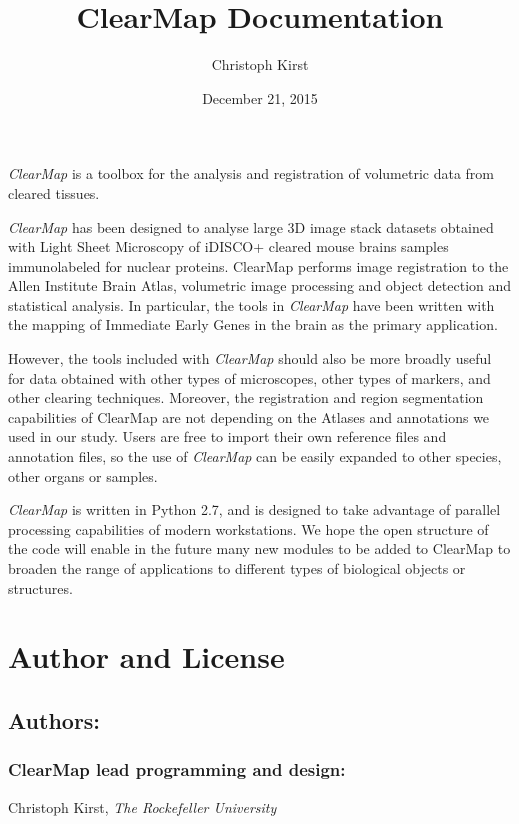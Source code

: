 \documentclass[letterpaper,10pt,english]{sphinxmanual}
\title{ClearMap Documentation}
\date{December 21, 2015}
\author{Christoph Kirst}
\begin{document}
\maketitle
\tableofcontents
{}\label{index::doc}


\emph{ClearMap} is a toolbox for the analysis and registration of volumetric data
from cleared tissues.

\emph{ClearMap} has been designed to analyse large 3D image stack datasets obtained with Light Sheet Microscopy
of iDISCO+ cleared mouse brains samples immunolabeled for nuclear proteins. ClearMap performs image registration to the Allen Institute Brain Atlas, volumetric image processing and object detection and statistical analysis. In particular, the tools in \emph{ClearMap} have been written with the mapping of Immediate Early Genes in the brain as the primary application.

However, the tools included with \emph{ClearMap} should also be more broadly useful for data obtained with other types of microscopes, other types of markers, and other clearing techniques. Moreover, the registration and region segmentation capabilities of ClearMap are not depending on the Atlases and annotations we used in our study. Users are free to import their own reference files and annotation files, so the use of \emph{ClearMap} can be easily expanded to other species, other organs or samples.

\emph{ClearMap} is written in Python 2.7, and is designed to take advantage of parallel processing capabilities of modern workstations. We hope the open structure of the code will enable in the future many new modules to be added to ClearMap to broaden the range of applications to different types of biological objects or structures.


\chapter{Author and License}
\label{index:clearmap}\label{index:author-and-license}

\section{Authors:}
\label{index:authors}

\subsection{ClearMap lead programming and design:}
\label{index:clearmap-lead-programming-and-design}
Christoph Kirst,
\emph{The Rockefeller University}
\end{document}
